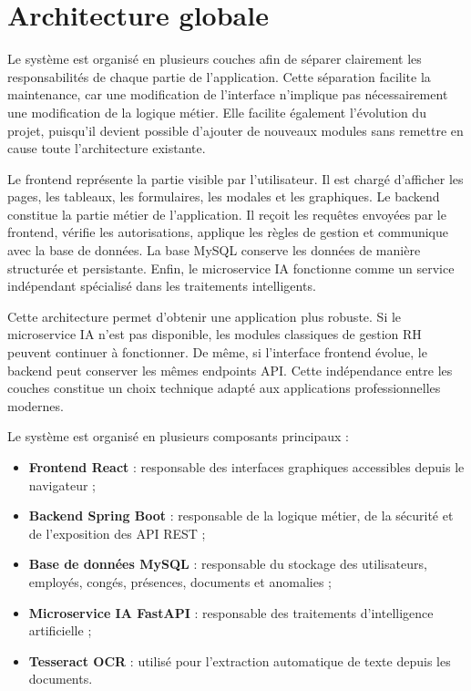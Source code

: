\documentclass[12pt,a4paper]{report}
\begin{document}
\section{Architecture globale}

Le système est organisé en plusieurs couches afin de séparer clairement les responsabilités de chaque partie de l'application. Cette séparation facilite la maintenance, car une modification de l'interface n'implique pas nécessairement une modification de la logique métier. Elle facilite également l'évolution du projet, puisqu'il devient possible d'ajouter de nouveaux modules sans remettre en cause toute l'architecture existante.

Le frontend représente la partie visible par l'utilisateur. Il est chargé d'afficher les pages, les tableaux, les formulaires, les modales et les graphiques. Le backend constitue la partie métier de l'application. Il reçoit les requêtes envoyées par le frontend, vérifie les autorisations, applique les règles de gestion et communique avec la base de données. La base MySQL conserve les données de manière structurée et persistante. Enfin, le microservice IA fonctionne comme un service indépendant spécialisé dans les traitements intelligents.

Cette architecture permet d'obtenir une application plus robuste. Si le microservice IA n'est pas disponible, les modules classiques de gestion RH peuvent continuer à fonctionner. De même, si l'interface frontend évolue, le backend peut conserver les mêmes endpoints API. Cette indépendance entre les couches constitue un choix technique adapté aux applications professionnelles modernes.

Le système est organisé en plusieurs composants principaux :

\begin{itemize}
    \item \textbf{Frontend React} : responsable des interfaces graphiques accessibles depuis le navigateur ;
    \item \textbf{Backend Spring Boot} : responsable de la logique métier, de la sécurité et de l'exposition des API REST ;
    \item \textbf{Base de données MySQL} : responsable du stockage des utilisateurs, employés, congés, présences, documents et anomalies ;
    \item \textbf{Microservice IA FastAPI} : responsable des traitements d'intelligence artificielle ;
    \item \textbf{Tesseract OCR} : utilisé pour l'extraction automatique de texte depuis les documents.
\end{itemize}
\end{document}

